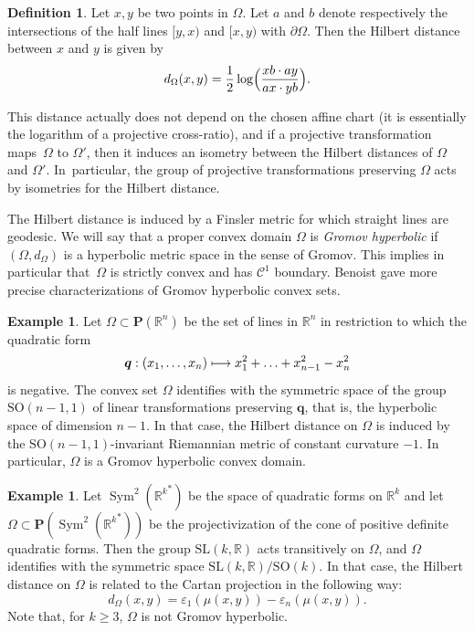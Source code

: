 \documentclass[JEP,XML,SOM,Unicode,NoEqCountersInSection,NoFloatCountersInSection,published]{cedram}
\newcommand\mto{\mathchoice{\longmapsto}{\mapsto}{\mapsto}{\mapsto}}
\theoremstyle{definition}
\newtheorem{defi}[theo]{Definition}
\newtheorem{example}[theo]{Example}
\newcommand{\proj}{\mathbf{P}}
\newcommand{\R}{\mathbb{R}}
\newcommand{\SL}{\mathrm{SL}}
\newcommand{\SO}{\mathrm{SO}}
\DeclareMathOperator{\Sym}{Sym}
\let\epsilon\varepsilon
\begin{document}
\begin{defi}
Let $x,y$ be two points in $\Omega$. Let $a$ and $b$ denote respectively the intersections of the half lines $[y,x)$ and $[x,y)$ with $\partial \Omega$. Then the Hilbert distance between $x$ and $y$ is given by
\[d_\Omega(x,y) = \frac{1}{2}\log\Bigl(\frac{xb\cdot ay}{ax \cdot yb}\Bigr).\]
\end{defi}

This distance actually does not depend on the chosen affine chart (it is essentially the logarithm of a projective cross-ratio), and if a projective transformation maps~$\Omega$ to $\Omega'$, then it induces an isometry between the Hilbert distances of $\Omega$ and $\Omega'$. In~particular, the group of projective transformations preserving $\Omega$ acts by isometries for the Hilbert distance.

The Hilbert distance is induced by a Finsler metric for which straight lines are geodesic. We will say that a proper convex domain $\Omega$ is \emph{Gromov hyperbolic} if $(\Omega,d_\Omega)$ is a hyperbolic metric space in the sense of Gromov. This implies in particular that~$\Omega$ is strictly convex and has $\mathcal C^1$ boundary. Benoist \cite{Benoist2001convexe} gave more precise characterizations of Gromov hyperbolic convex sets.

\begin{example} \label{ex:Ellipsoid}
Let $\Omega \subset \proj(\R^n)$ be the set of lines in $\R^n$ in restriction to which the quadratic form
\[\boldsymbol{q} :(x_1,\ldots,x_n) \mto x_1^2+ \ldots + x_{n-1}^2 - x_n^2\]
is negative. The convex set $\Omega$ identifies with the symmetric space of the group \hbox{$\SO(n-1,1)$} of linear transformations preserving $\boldsymbol{q}$, that is, the hyperbolic space of dimension $n-1$. In that case, the Hilbert distance on $\Omega$ is induced by the $\SO(n-1,1)$-invariant Riemannian metric of constant curvature $-1$. In particular, $\Omega$ is a Gromov hyperbolic convex domain.
\end{example}

\begin{example} \label{ex:ConvexSymmetricSpace}
Let $\Sym^2({\R^k}^*)$ be the space of quadratic forms on $\R^k$ and let $\Omega \subset \proj(\Sym^2({\R^k}^*))$ be the projectivization of the cone of positive definite quadratic forms. Then the group $\SL(k,\R)$ acts transitively on $\Omega$, and $\Omega$ identifies with the symmetric space $\SL(k,\R)/\SO(k)$. In that case, the Hilbert distance on $\Omega$ is related to the Cartan projection in the following way:
\[d_\Omega(x,y) = \epsilon_1(\mu(x,y)) - \epsilon_n(\mu(x,y)).\]
Note that, for $k\geq 3$, $\Omega$ is not Gromov hyperbolic.
\end{example}
\end{document}
